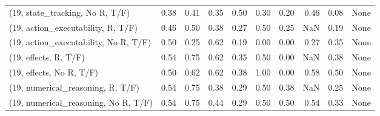 \begin{table*}[h!]
\begin{adjustbox}{width=2\columnwidth,center}
\begin{tabular}{lrrr|rrr|rrr}
(19, state\_tracking, No R, T/F)       &                      0.38 &                  0.41 &                      0.35 &                          0.50 &                      0.30 &                          0.20 &                                   0.46 &                               0.08 &                                  None \\
(19, action\_executability, R, T/F)    &                      0.46 &                  0.50 &                      0.38 &                          0.27 &                      0.50 &                          0.25 &                                    NaN &                               0.19 &                                  None \\
(19, action\_executability, No R, T/F) &                      0.50 &                  0.25 &                      0.62 &                          0.19 &                      0.00 &                          0.00 &                                   0.27 &                               0.35 &                                  None \\
(19, effects, R, T/F)                 &                      0.54 &                  0.75 &                      0.62 &                          0.35 &                      0.50 &                          0.00 &                                    NaN &                               0.38 &                                  None \\
(19, effects, No R, T/F)              &                      0.50 &                  0.62 &                      0.62 &                          0.38 &                      1.00 &                          0.00 &                                   0.58 &                               0.50 &                                  None \\
(19, numerical\_reasoning, R, T/F)     &                      0.54 &                  0.75 &                      0.38 &                          0.29 &                      0.50 &                          0.38 &                                    NaN &                               0.25 &                                  None \\
(19, numerical\_reasoning, No R, T/F)  &                      0.54 &                  0.75 &                      0.44 &                          0.29 &                      0.50 &                          0.50 &                                   0.54 &                               0.33 &                                  None \\

\end{tabular}
\end{adjustbox}
\end{table*}
